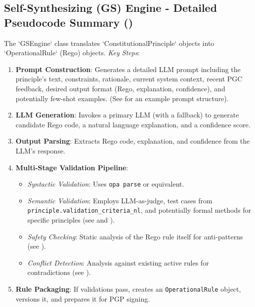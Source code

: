 \documentclass[sigconf,natbib]{acmart}
\begin{document}
\subsection[Self-Synthesizing (GS) Engine - Detailed Pseudocode Summary]{Self-Synthesizing (GS) Engine - Detailed Pseudocode Summary ()}
\label{app:gs_engine_pseudocode}
The `GSEngine` class translates `ConstitutionalPrinciple` objects into `OperationalRule` (Rego) objects.
\textit{Key Steps}:
\begin{enumerate}
    \item \textbf{Prompt Construction}: Generates a detailed LLM prompt including the principle's text, constraints, rationale, current system context, recent PGC feedback, desired output format (Rego, explanation, confidence), and potentially few-shot examples. (See  for an example prompt structure).
    \item \textbf{LLM Generation}: Invokes a primary LLM (with a fallback) to generate candidate Rego code, a natural language explanation, and a confidence score.
    \item \textbf{Output Parsing}: Extracts Rego code, explanation, and confidence from the LLM's response.
    \item \textbf{Multi-Stage Validation Pipeline}:
    \begin{itemize}
        \item \textit{Syntactic Validation}: Uses \texttt{opa parse} or equivalent.
        \item \textit{Semantic Validation}: Employs LLM-as-judge, test cases from \texttt{principle.validation\_criteria\_nl}, and potentially formal methods for specific principles (see  and ).
        \item \textit{Safety Checking}: Static analysis of the Rego rule itself for anti-patterns (see ).
        \item \textit{Conflict Detection}: Analysis against existing active rules for contradictions (see ).
    \end{itemize}
    \item \textbf{Rule Packaging}: If validations pass, creates an \texttt{OperationalRule} object, versions it, and prepares it for PGP signing.
\end{enumerate}
\end{document}
